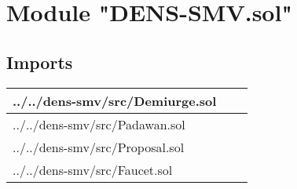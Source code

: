 
\section{Module "DENS-SMV.sol"}


\subsection{Imports}


\noindent\begin{tabular}{|l|l|p{5cm}|}\hline
../../dens-smv/src/Demiurge.sol &\\\hline
../../dens-smv/src/Padawan.sol &\\\hline
../../dens-smv/src/Proposal.sol &\\\hline
../../dens-smv/src/Faucet.sol &\\\hline
\end{tabular}

